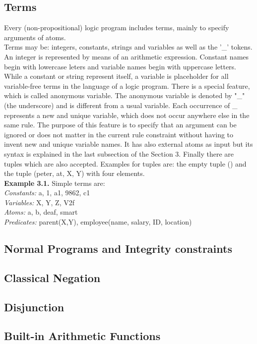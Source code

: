 \documentclass[14pt,a4paper, titlepage]{article}
\begin{document}
\subsection{Terms}
Every (non-propositional) logic program includes terms, mainly to specify arguments of atoms. \\Terms may be: integers, constants, strings and variables as well as the '\_' tokens. An integer is represented by means of an arithmetic expression. Constant names begin with lowercase leters and variable names begin with uppercase letters. \\ While a constant or string represent itself, a variable is placeholder for all variable-free terms in the language of a logic program. There is a special feature, which is called anonymous variable. The anonymous variable is denoted by "\_" (the underscore) and is different from a usual variable. Each occurrence of \_ represents a new and unique variable, which does not occur anywhere else in the same rule. The purpose of this feature is to specify that an argument can be ignored or does not matter in the current rule constraint without having to invent new and unique variable names.  It has also external atoms as input but its syntax is explained in the last subsection of the Section 3. Finally there are tuples which are also accepted. Examples for tuples are: the empty tuple () and the tuple (peter, at, X, Y) with four elements.\bigskip
\\ \textbf{Example 3.1.} 
Simple terms are:
\\ \textit{Constants:} a, 1, a1, 9862, c1
\\ \textit{Variables:} X, Y, Z, V2f
\\ \textit{Atoms:} a, b, deaf, smart
\\ \textit{Predicates:} parent(X,Y), employee(name, salary, ID, location)
       

\subsection{Normal Programs and Integrity constraints}

\subsection{Classical Negation}
\subsection{Disjunction}
\subsection{Built-in Arithmetic Functions}
\end{document}

